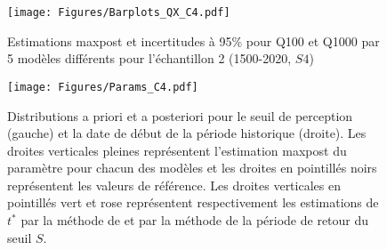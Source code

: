\documentclass[11pt]{article}
\begin{document}
	
	\begin{figure}[h]
		\centering
		\texttt{[image: Figures/Barplots\_QX\_C4.pdf]}
		\caption{Estimations maxpost et incertitudes à 95\% pour Q100 et Q1000 par 5 modèles différents pour l'échantillon 2 (1500-2020, $S4$)}
		\label{fig:BarplotC4}
	\end{figure}
	
		\begin{table}[h]
	\centering
	\caption{Résultats maxpost et incertitudes de 6 modèles pour l'échantillon 2. Le modèle $D^*$ représente les résultats du modèle D avec des a priori plus informatifs (section \ref{subsec:D*}). Q100 et Q1000 représentent respectivement le débit des crues centennales et millénales, $\xi$ le paramètre de forme de la distribution GEV, $S$ le seuil de perception et $t^{*}$ la date de début de la période historique. Les écarts type des distributions a posteriori sont représentés par les colonnes débutant par la lettre "u".}
		\label{tab:ResC4}

	\end{table}
	

	\begin{figure}[h]
		\centering
		\texttt{[image: Figures/Params\_C4.pdf]}	
		\caption{Distributions a priori et a posteriori pour le seuil de perception (gauche) et la date de début de la période historique (droite). Les droites verticales pleines représentent l'estimation maxpost du paramètre pour chacun des modèles et les droites en pointillés noirs représentent les valeurs de référence. Les droites verticales en pointillés vert et rose représentent respectivement les estimations de $t^{*}$ par la méthode de \citet{prosdocimi_german_2018} et par la méthode de la période de retour du seuil $S$.}
		\label{fig:Params_C4}
	\end{figure}
\end{document}
